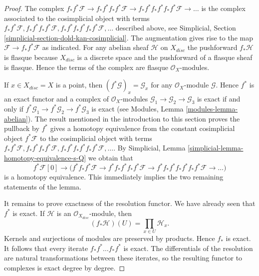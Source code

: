 \begin{proof}
The complex $f_*f^*\mathcal{F} \to  f_*f^*f_*f^*\mathcal{F} \to
f_*f^*f_*f^*f_*f^*\mathcal{F} \to \ldots$ is the complex associated
to the cosimplicial object with terms
$f_*f^*\mathcal{F}, f_*f^*f_*f^*\mathcal{F},
f_*f^*f_*f^*f_*f^*\mathcal{F}, \ldots$ described above, see
Simplicial, Section \ref{simplicial-section-dold-kan-cosimplicial}.
The augmentation gives rise to the map $\mathcal{F} \to f_*f^*\mathcal{F}$
as indicated. For any abelian sheaf $\mathcal{H}$ on $X_{disc}$ the
pushforward $f_*\mathcal{H}$ is flasque because $X_{disc}$
is a discrete space and the pushforward of a flasque sheaf is flasque.
Hence the terms of the complex are flasque $\mathcal{O}_X$-modules.

\medskip\noindent
If $x \in X_{disc} = X$ is a point, then $(f^*\mathcal{G})_x = \mathcal{G}_x$
for any $\mathcal{O}_X$-module $\mathcal{G}$. Hence $f^*$ is an exact functor
and a complex of $\mathcal{O}_X$-modules
$\mathcal{G}_1 \to \mathcal{G}_2 \to \mathcal{G}_3$
is exact if and only if
$f^*\mathcal{G}_1 \to f^*\mathcal{G}_2 \to f^*\mathcal{G}_3$
is exact (see Modules, Lemma \ref{modules-lemma-abelian}).
The result mentioned in the introduction to this section
proves the pullback by $f^*$ gives a homotopy equivalence from
the constant cosimplicial object $f^*\mathcal{F}$ to the
cosimplicial object with terms
$f_*f^*\mathcal{F}, f_*f^*f_*f^*\mathcal{F},
f_*f^*f_*f^*f_*f^*\mathcal{F}, \ldots$.
By Simplicial, Lemma \ref{simplicial-lemma-homotopy-equivalence-s-Q}
we obtain that
$$
f^*\mathcal{F}[0] \to \Big(
f^*f_*f^*\mathcal{F} \to
f^*f_*f^*f_*f^*\mathcal{F} \to
f^*f_*f^*f_*f^*f_*f^*\mathcal{F} \to \ldots
\Big)
$$
is a homotopy equivalence. This immediately implies the two remaining
statements of the lemma.

It remains to prove exactness of the resolution functor. We have already
seen that $f^*$ is exact. If $\mathcal{H}$ is an
$\mathcal{O}_{X_{disc}}$-module, then
$$
(f_*\mathcal{H})(U) = \prod_{x \in U} \mathcal{H}_x.
$$
Kernels and surjections of modules are preserved by products. Hence $f_*$
is exact. It follows that every iterate $f_*f^*\ldots f_*f^*$ is exact.
The differentials of the resolution are natural transformations between
these iterates, so the resulting functor to complexes is exact degree by
degree.
\end{proof}

